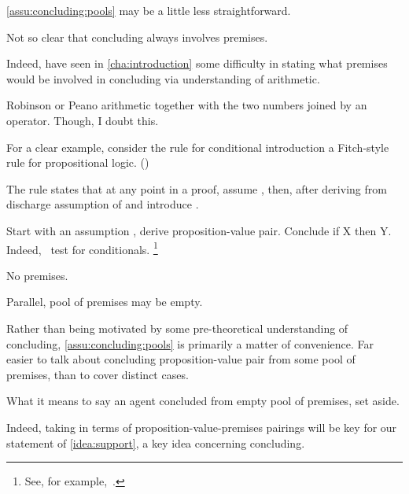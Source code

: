 \begin{note}
  \autoref{assu:concluding:pools} may be a little less straightforward.

  Not so clear that concluding always involves premises.

  Indeed, have seen in \autoref{cha:introduction} some difficulty in stating what premises would be involved in concluding via understanding of arithmetic.

    Robinson or Peano arithmetic together with the two numbers joined by an operator.
  Though, I doubt this.

  For a clear example, consider the rule for conditional introduction a Fitch-style rule for propositional logic.
    (\cite[cf.][206]{Barwise:1999tu})

  \begin{quote}
  \end{quote}

  {
    \color{red}
    The rule states that at any point in a proof, assume , then, after deriving  from  discharge assumption of  and introduce .
  }

  Start with an assumption , derive proposition-value pair.
  Conclude if X then Y.
  Indeed,~\citeauthor{Ramsey:1929tf} test for conditionals.%
  \footnote{
    See, for example,~\textcite{Read:1995wf}.
  }

  No premises.

  Parallel, pool of premises may be empty.

  Rather than being motivated by some pre-theoretical understanding of concluding, \autoref{assu:concluding:pools} is primarily a matter of convenience.
  Far easier to talk about concluding proposition-value pair from some pool of premises, than to cover distinct cases.

  What it means to say an agent concluded from empty pool of premises, set aside.

  Indeed, taking in terms of proposition-value-premises pairings will be key for our statement of \autoref{idea:support}, a key idea concerning concluding.
\end{note}

